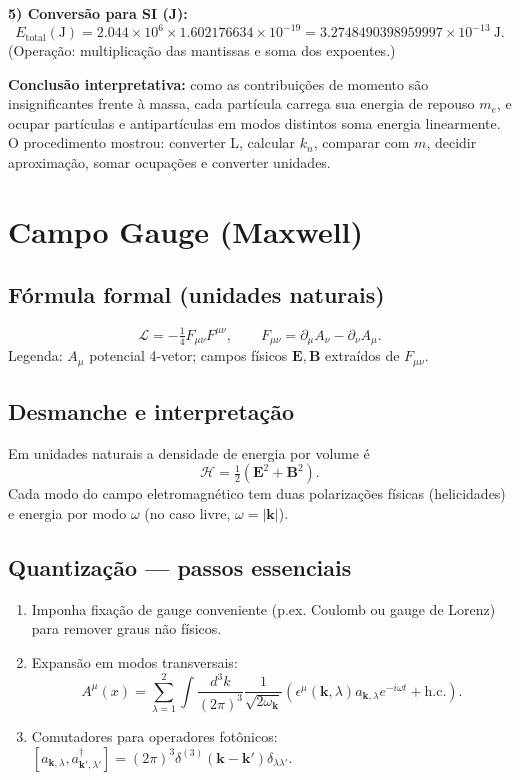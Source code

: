 \documentclass[12pt,a4paper]{article}
\begin{document}
\textbf{5) Conversão para SI (J):}
\[ E_{\text{total}}(\mathrm{J}) = 2.044\times10^{6}\times 1.602176634\times10^{-19} = 3.2748490398959997\times10^{-13}\ \mathrm{J}. \]
(Operação: multiplicação das mantissas e soma dos expoentes.)

\textbf{Conclusão interpretativa:} como as contribuições de momento são insignificantes frente à massa, cada partícula carrega sua energia de repouso $m_e$, e ocupar partículas e antipartículas em modos distintos soma energia linearmente. O procedimento mostrou: converter L, calcular $k_n$, comparar com $m$, decidir aproximação, somar ocupações e converter unidades.

\section{Campo Gauge (Maxwell)}
\subsection{Fórmula formal (unidades naturais)}
\begin{equation}\label{lag_maxwell}
\mathcal{L} = -\tfrac{1}{4}F_{\mu\nu}F^{\mu\nu},\qquad F_{\mu\nu}=\partial_\mu A_\nu-\partial_\nu A_\mu.
\end{equation}
Legenda: $A_\mu$ potencial 4-vetor; campos físicos $\mathbf{E},\mathbf{B}$ extraídos de $F_{\mu\nu}$.

\subsection{Desmanche e interpretação}
Em unidades naturais a densidade de energia por volume é
\[ \mathcal{H} = \tfrac{1}{2}(\mathbf{E}^2 + \mathbf{B}^2). \]
Cada modo do campo eletromagnético tem duas polarizações físicas (helicidades) e energia por modo $\omega$ (no caso livre, $\omega=|\mathbf{k}|$).

\subsection{Quantização — passos essenciais}
\begin{enumerate}
  \item Imponha fixação de gauge conveniente (p.ex. Coulomb ou gauge de Lorenz) para remover graus não físicos.
  \item Expansão em modos transversais: 
  \[ A^\mu(x)=\sum_{\lambda=1}^2\int\frac{d^3k}{(2\pi)^3}\frac{1}{\sqrt{2\omega_{\mathbf{k}}}}\left(\epsilon^\mu(\mathbf{k},\lambda)a_{\mathbf{k},\lambda}e^{-i\omega t}+\text{h.c.}\right). \]
  \item Comutadores para operadores fotônicos: $[a_{\mathbf{k},\lambda},a_{\mathbf{k}',\lambda'}^\dagger]=(2\pi)^3\delta^{(3)}(\mathbf{k}-\mathbf{k}')\delta_{\lambda\lambda'}$.
\end{enumerate}
\end{document}
